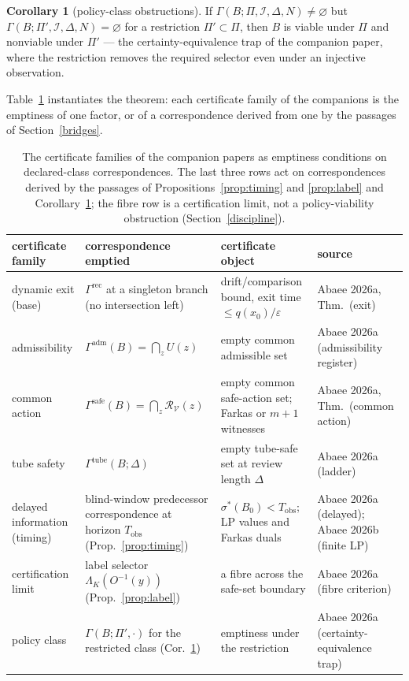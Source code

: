 \documentclass[10pt,twocolumn]{article}
\theoremstyle{definition}
\newtheorem{corollary}{Corollary}
\begin{document}
\begin{corollary}[policy-class obstructions]\label{cor:ce}
If \(\Gamma(B; \Pi, \mathcal{I}, \Delta, N) \neq \varnothing\) but
\(\Gamma(B; \Pi', \mathcal{I}, \Delta, N) = \varnothing\) for a restriction
\(\Pi' \subset \Pi\), then \(B\) is viable under \(\Pi\) and nonviable under
\(\Pi'\) --- the certainty-equivalence trap of the companion paper, where the
restriction removes the required selector even under an injective
observation.
\end{corollary}

Table~\ref{tab:families} instantiates the theorem: each certificate family
of the companions is the emptiness of one factor, or of a correspondence
derived from one by the passages of Section~\ref{bridges}.

\begin{table}[t]
\centering
\footnotesize
\begin{tabular}{@{}>{\raggedright\arraybackslash}p{24mm}|>{\raggedright\arraybackslash}p{50mm}|>{\raggedright\arraybackslash}p{46mm}|>{\raggedright\arraybackslash}p{38mm}@{}}
\toprule
certificate family & correspondence emptied & certificate object & source \\
\midrule
dynamic exit (base) & \(\Gamma^{\mathrm{rec}}\) at a singleton branch (no
intersection left) & drift/comparison bound, exit time \(\le q(x_0)/\varepsilon\) & Abaee 2026a, Thm.\ (exit) \\
admissibility & \(\Gamma^{\mathrm{adm}}(B) = \bigcap_{z} U(z)\) &
empty common admissible set & Abaee 2026a (admissibility register) \\
common action & \(\Gamma^{\mathrm{safe}}(B) = \bigcap_{z}
\mathcal{R}_{\mathcal{V}}(z)\) & empty common safe-action set; Farkas or
\(m{+}1\) witnesses & Abaee 2026a, Thm.\ (common action) \\
tube safety & \(\Gamma^{\mathrm{tube}}(B;\Delta)\) &
empty tube-safe set at review length \(\Delta\) & Abaee 2026a (ladder) \\
delayed information (timing) & blind-window predecessor correspondence at
horizon \(T_{\mathrm{obs}}\) (Prop.~\ref{prop:timing}) &
\(\sigma^{*}(B_0) < T_{\mathrm{obs}}\); LP values and Farkas duals &
Abaee 2026a (delayed); Abaee 2026b (finite LP) \\
certification limit & label selector \(\Lambda_{K}(O^{-1}(y))\)
(Prop.~\ref{prop:label}) & a fibre across the safe-set boundary &
Abaee 2026a (fibre criterion) \\
policy class & \(\Gamma(B; \Pi', \cdot)\) for the restricted class
(Cor.~\ref{cor:ce}) & emptiness under the restriction &
Abaee 2026a (certainty-equivalence trap) \\
\bottomrule
\end{tabular}
\caption{The certificate families of the companion papers as emptiness
conditions on declared-class correspondences. The last three rows act on
correspondences derived by the passages of Propositions~\ref{prop:timing}
and \ref{prop:label} and Corollary~\ref{cor:ce}; the fibre row is a
certification limit, not a policy-viability obstruction
(Section~\ref{discipline}).}
\label{tab:families}
\end{table}
\end{document}
